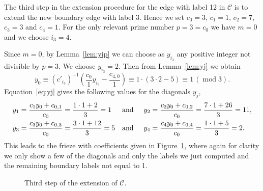 \documentclass[ALCO,ThmDefs,Unicode,epreuves,published]{cedram}
\numberwithin{equation}{section}
\DeclareMathOperator{\md}{mod}
\begin{document}

The third step in the extension procedure for the edge with label 12 in $\mathcal{C}$ 
is to extend the new boundary edge with label $3$. Hence we set $c_0=3$, $c_1=1$, $c_2=7$,
$c_3=3$ and $c_4=1$. For the only relevant prime number $p=3=c_0$
we have $m=0$ and we choose $i_3=4$. 

Since $m=0$, by 
Lemma~\ref{lem:yip} we can choose as $y_{i_3}$ any positive integer 
not divisible by $p=3$. We choose 
$y_{i_3}=2$. Then from Lemma~\ref{lem:yj} we obtain
\[
y_0 \equiv (c'_{i_3})^{-1} \left( \frac{c_0}{1} y_{i_3} - \frac{c_{4,0}}{1}\right)
\equiv 1\cdot (3\cdot 2-5) \equiv 1\,(\md 3).
\]
Equation~\eqref{eq:yj} gives the following values for the diagonals $y_j$, 
\begin{align*}
y_1&=\frac{c_1y_0+c_{0,1}}{c_0} = \frac{1\cdot 1 +2}{3} = 1
&\mbox{and}\hskip0.5cm
y_2&=\frac{c_2y_0+c_{0,2}}{c_0} = \frac{7\cdot 1 +26}{3} = 11,
\\
y_3&=\frac{c_3y_0+c_{0,3}}{c_0} = \frac{3\cdot 1 +12}{3} = 5
&\mbox{and}\hskip0.5cm
y_4&=\frac{c_4y_0+c_{0,4}}{c_0} = \frac{1\cdot 1 +5}{3} = 2.
\end{align*}
This leads to the frieze with coefficients given in Figure~\ref{fig:fwcext3},
where again for clarity we only show a few of the diagonals and only the labels
we just computed and the remaining boundary labels not equal to 1.



\begin{figure}[htb]\centering
{}
 
 \vspace*{-3mm}
 \caption{Third step of the extension of $\mathcal{C}$.
 \label{fig:fwcext3}}
\end{figure}
\end{document}
